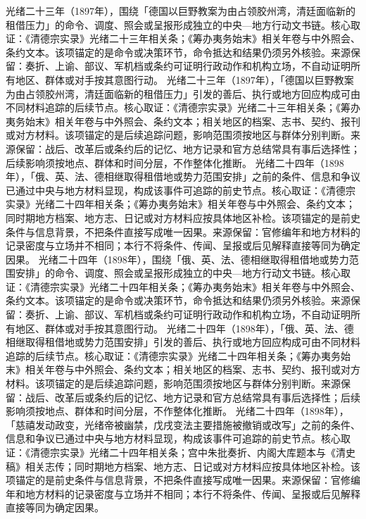 光绪二十三年（1897年），围绕「德国以巨野教案为由占领胶州湾，清廷面临新的租借压力」的命令、调度、照会或呈报形成独立的中央—地方行动文书链。核心取证：《清德宗实录》光绪二十三年相关条；《筹办夷务始末》相关年卷与中外照会、条约文本。该项锚定的是命令或决策环节，命令抵达和结果仍须另外核验。来源保留：奏折、上谕、部议、军机档或条约可证明行政动作和机构立场，不自动证明所有地区、群体或对手按其意图行动。
光绪二十三年（1897年），「德国以巨野教案为由占领胶州湾，清廷面临新的租借压力」引发的善后、执行或地方回应构成可由不同材料追踪的后续节点。核心取证：《清德宗实录》光绪二十三年相关条；《筹办夷务始末》相关年卷与中外照会、条约文本；相关地区的档案、志书、契约、报刊或对方材料。该项锚定的是后续追踪问题，影响范围须按地区与群体分别判断。来源保留：战后、改革后或条约后的记忆、地方记录和官方总结常具有事后选择性；后续影响须按地点、群体和时间分层，不作整体化推断。
光绪二十四年（1898年），「俄、英、法、德相继取得租借地或势力范围安排」之前的条件、信息和争议已通过中央与地方材料显现，构成该事件可追踪的前史节点。核心取证：《清德宗实录》光绪二十四年相关条；《筹办夷务始末》相关年卷与中外照会、条约文本；同时期地方档案、地方志、日记或对方材料应按具体地区补检。该项锚定的是前史条件与信息背景，不把条件直接写成唯一因果。来源保留：官修编年和地方材料的记录密度与立场并不相同；本行不将条件、传闻、呈报或后见解释直接等同为确定因果。
光绪二十四年（1898年），围绕「俄、英、法、德相继取得租借地或势力范围安排」的命令、调度、照会或呈报形成独立的中央—地方行动文书链。核心取证：《清德宗实录》光绪二十四年相关条；《筹办夷务始末》相关年卷与中外照会、条约文本。该项锚定的是命令或决策环节，命令抵达和结果仍须另外核验。来源保留：奏折、上谕、部议、军机档或条约可证明行政动作和机构立场，不自动证明所有地区、群体或对手按其意图行动。
光绪二十四年（1898年），「俄、英、法、德相继取得租借地或势力范围安排」引发的善后、执行或地方回应构成可由不同材料追踪的后续节点。核心取证：《清德宗实录》光绪二十四年相关条；《筹办夷务始末》相关年卷与中外照会、条约文本；相关地区的档案、志书、契约、报刊或对方材料。该项锚定的是后续追踪问题，影响范围须按地区与群体分别判断。来源保留：战后、改革后或条约后的记忆、地方记录和官方总结常具有事后选择性；后续影响须按地点、群体和时间分层，不作整体化推断。
光绪二十四年（1898年），「慈禧发动政变，光绪帝被幽禁，戊戌变法主要措施被撤销或改写」之前的条件、信息和争议已通过中央与地方材料显现，构成该事件可追踪的前史节点。核心取证：《清德宗实录》光绪二十四年相关条；宫中朱批奏折、内阁大库题本与《清史稿》相关志传；同时期地方档案、地方志、日记或对方材料应按具体地区补检。该项锚定的是前史条件与信息背景，不把条件直接写成唯一因果。来源保留：官修编年和地方材料的记录密度与立场并不相同；本行不将条件、传闻、呈报或后见解释直接等同为确定因果。
